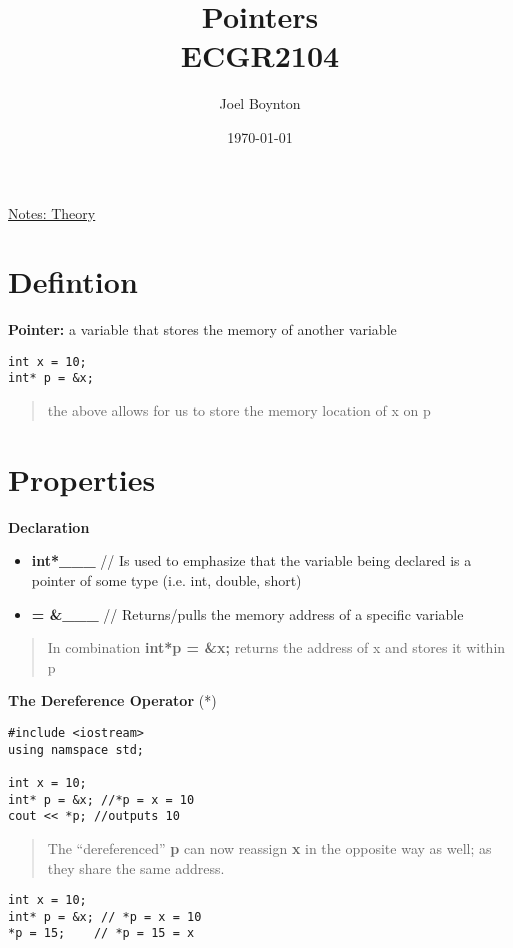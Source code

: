 \documentclass[11pt]{article}
\author{Joel Boynton}
\date{\today}
\title{Pointers\\\medskip
\large ECGR2104}
\begin{document}
\maketitle
\href{ecgr2104.org}{Notes: Theory}
\section{Defintion}
\label{sec:org367eccf}
\textbf{Pointer:} a variable that stores the memory of another variable
\begin{verbatim}
int x = 10;
int* p = &x;
\end{verbatim}
\begin{quote}
the above allows for us to store the memory location of x on p
\end{quote}
\section{Properties}
\label{sec:orga525f9f}
\textbf{Declaration}

\begin{itemize}
\item \textbf{int*\_\_\_}     // Is used to emphasize that the variable being declared is a pointer of some type (i.e. int, double, short)

\item \textbf{= \&\_\_\_}   // Returns/pulls the memory address of a specific variable
\end{itemize}

\begin{quote}
In combination \textbf{int*p = \&x;} returns the address of x and stores it within p
\end{quote}
\textbf{The Dereference Operator} (*)
\begin{verbatim}
#include <iostream>
using namspace std;

int x = 10;
int* p = &x; //*p = x = 10
cout << *p; //outputs 10
\end{verbatim}
\begin{quote}
The ``dereferenced'' \textbf{p} can now reassign \textbf{x} in the opposite way as well; as they share the same address.
\end{quote}
\begin{verbatim}
int x = 10;
int* p = &x; // *p = x = 10
*p = 15;    // *p = 15 = x
\end{verbatim}
\end{document}
